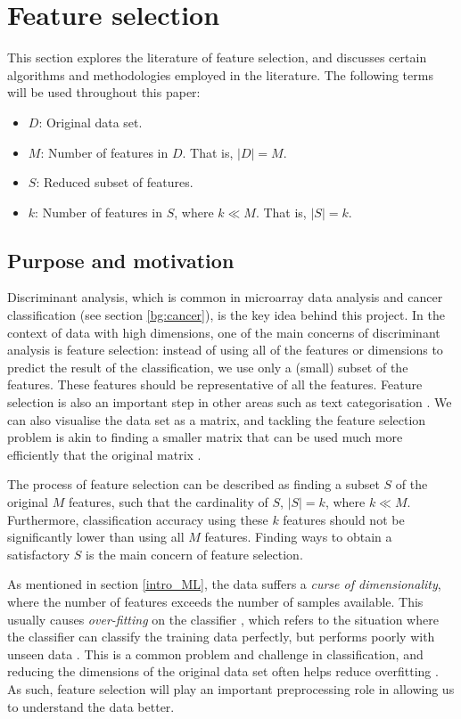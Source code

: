 \documentclass[12pt, twoside, a4paper]{report}
\begin{document}
\section{Feature selection} \label{bg:feature_selection}

This section explores the literature of feature selection, and discusses certain algorithms and methodologies employed in the literature. The following terms will be used throughout this paper:
\begin{itemize}
  \item $D$: Original data set.
  \item $M$: Number of features in $D$. That is, $|D| = M$.
  \item $S$: Reduced subset of features.
  \item $k$: Number of features in $S$, where $k \ll M$. That is, $|S| = k$.
\end{itemize}

\subsection{Purpose and motivation} \label{bg:fs:purpose}

Discriminant analysis, which is common in microarray data analysis and cancer classification (see section \ref{bg:cancer}), is the key idea behind this project. In the context of data with high dimensions, one of the main concerns of discriminant analysis is feature selection: instead of using all of the features or dimensions to predict the result of the classification, we use only a (small) subset of the features. These features should be representative of all the features. Feature selection is also an important step in other areas such as text categorisation \cite{RefWorks:197}. We can also visualise the data set as a matrix, and tackling the feature selection problem is akin to finding a smaller matrix that can be used much more efficiently that the original matrix \cite{RefWorks:163}.

The process of feature selection can be described as finding a subset $S$ of the original $M$ features, such that the cardinality of $S$, $|S|=k$, where $k \ll M$. Furthermore, classification accuracy using these $k$ features should not be significantly lower than using all $M$ features. Finding ways to obtain a satisfactory $S$ is the main concern of feature selection.

As mentioned in section \ref{intro_ML}, the data suffers a \textit{curse of dimensionality}, where the number of features exceeds the number of samples available. This usually causes \textit{over-fitting} on the classifier \cite{RefWorks:115, RefWorks:175}, which refers to the situation where the classifier can classify the training data perfectly, but performs poorly with unseen data \cite{RefWorks:98}. This is a common problem and challenge in classification, and reducing the dimensions of the original data set often helps reduce overfitting \cite{RefWorks:228}. As such, feature selection will play an important preprocessing role in allowing us to understand the data better.
\end{document}
